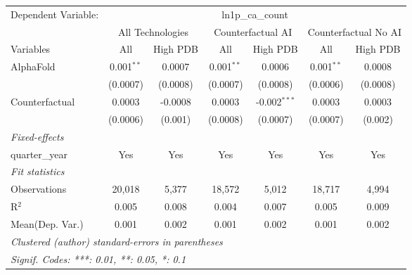 \begingroup
\centering
\begin{tabular}{lcccccc}
   \tabularnewline \midrule \midrule
   Dependent Variable: & \multicolumn{6}{c}{ln1p\_ca\_count}\\
 & \multicolumn{2}{c}{All Technologies} & \multicolumn{2}{c}{Counterfactual AI} & \multicolumn{2}{c}{Counterfactual No AI} \\
\cmidrule(lr){1-1}\cmidrule(lr){2-3} \cmidrule(lr){4-5} \cmidrule(lr){6-7}
Variables & \multicolumn{1}{c}{All} & \multicolumn{1}{c}{High PDB} & \multicolumn{1}{c}{All} & \multicolumn{1}{c}{High PDB} & \multicolumn{1}{c}{All} & \multicolumn{1}{c}{High PDB} \\
\cmidrule(lr){1-1}\cmidrule(lr){2-2} \cmidrule(lr){3-3} \cmidrule(lr){4-4} \cmidrule(lr){5-5} \cmidrule(lr){6-6} \cmidrule(lr){7-7}
   AlphaFold      & 0.001$^{**}$ & 0.0007   & 0.001$^{**}$ & 0.0006         & 0.001$^{**}$ & 0.0008\\   
                  & (0.0007)     & (0.0008) & (0.0007)     & (0.0008)       & (0.0006)     & (0.0008)\\   
   Counterfactual & 0.0003       & -0.0008  & 0.0003       & -0.002$^{***}$ & 0.0003       & 0.0003\\   
                  & (0.0006)     & (0.001)  & (0.0008)     & (0.0007)       & (0.0007)     & (0.002)\\   
   \midrule
   \emph{Fixed-effects}\\
   quarter\_year  & Yes          & Yes      & Yes          & Yes            & Yes          & Yes\\  
   \midrule
   \emph{Fit statistics}\\
   Observations   & 20,018       & 5,377    & 18,572       & 5,012          & 18,717       & 4,994\\  
   R$^2$          & 0.005        & 0.008    & 0.004        & 0.007          & 0.005        & 0.009\\  
Mean(Dep. Var.) & 0.001 & 0.002 & 0.001 & 0.002 & 0.001 & 0.002 \\
   \midrule \midrule
   \multicolumn{7}{l}{\emph{Clustered (author) standard-errors in parentheses}}\\
   \multicolumn{7}{l}{\emph{Signif. Codes: ***: 0.01, **: 0.05, *: 0.1}}\\
\end{tabular}
\par\endgroup
